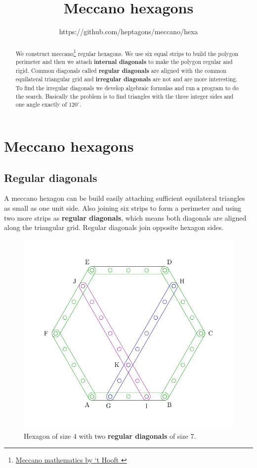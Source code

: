 \documentclass[11pt]{article}
\title{\textbf{Meccano hexagons}}
\author{https://github.com/heptagons/meccano/hexa}
\date{}
\begin{document}
\maketitle
\begin{abstract}
We construct meccano\footnote{
\href{https://webspace.science.uu.nl/~hooft101/lectures/meccano.pdf}{Meccano mathematics by `t Hooft }
}
regular hexagons.
We use six equal strips to build the polygon perimeter and then we attach \textbf{internal diagonals} to make the polygon regular and rigid. Common diagonals called \textbf{
regular diagonals} are aligned with the common equilateral triangular grid and \textbf{
irregular diagonals} are not and are more interesting. To find the irregular diagonals
we develop algebraic formulas and run a program to do the search. Basically the problem
is to find triangles with the three integer sides and one angle exactly of $120^\circ{}$.
\end{abstract}

\section{Meccano hexagons}

\subsection {Regular diagonals}
A meccano hexagon can be build easily attaching sufficient equilateral
triangles as small as one unit side. 
Also joining six strips to form a perimeter and using two more strips as \textbf{regular diagonals},
which means both diagonals are aligned along the triangular grid.
Regular diagonals join opposite hexagon sides.

\begin{figure}[htpb]
\centering
\includegraphics[scale=0.75]{hexagon_simple}
\caption{Hexagon of size $4$ with two \textbf{regular diagonals} of size $7$.}
\label{fig:regular}
\end{figure}
\end{document}
